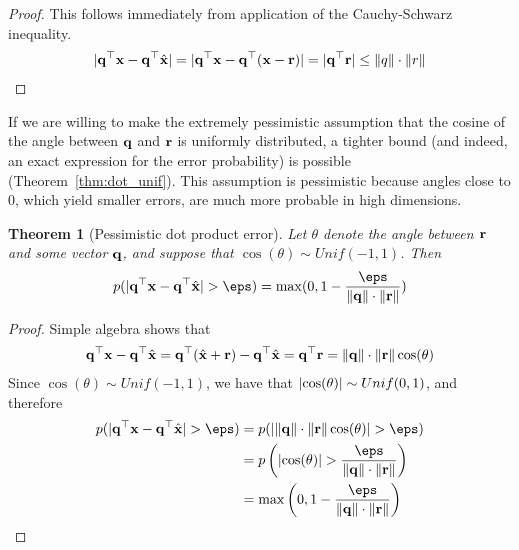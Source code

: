 \documentclass[]{article}
\newtheorem{theorem}{Theorem}[section]
\begin{document}
\begin{proof} \label{thm:dot_unif}
This follows immediately from application of the Cauchy-Schwarz inequality.
\begin{align}
    \lvert\mathbf{q}^\top \mathbf{x} - \mathbf{q}^\top \hat{\mathbf{x}}\rvert = \lvert\mathbf{q}^\top \mathbf{x} - \mathbf{q}^\top (\mathbf{x} - \mathbf{r})\rvert = \lvert\mathbf{q}^\top \mathbf{r}\rvert \le \lVert q\rVert \cdot \lVert r\rVert
\end{align}
\end{proof}


If we are willing to make the extremely pessimistic assumption that the cosine of the angle between $\mathbf{q}$ and $\mathbf{r}$ is uniformly distributed, a tighter bound (and indeed, an exact expression for the error probability) is possible (Theorem~\ref{thm:dot_unif}). This assumption is pessimistic because angles close to $0$, which yield smaller errors, are much more probable in high dimensions. %

\begin{theorem}[Pessimistic dot product error]
Let $\theta$ denote the angle between $\mathbf{r}$ and some vector $\mathbf{q}$, and suppose that $\cos(\theta) \sim Unif(-1, 1)$. Then
\begin{align}
    p(\abs{\q^\top \x - \q^\top \xhat} > \eps) = \max(0, 1 - \frac{\eps}{\norm{\q} \cdot \norm{\r}})
\end{align}
\end{theorem}

\begin{proof}
Simple algebra shows that
\begin{align} \label{eq:qTr}
    \mathbf{q}^\top \mathbf{x} - \mathbf{q}^\top \hat{\mathbf{x}} = \mathbf{q}^\top(\hat{\mathbf{x}} + \mathbf{r}) - \mathbf{q}^\top \hat{\mathbf{x}} = \mathbf{q}^\top \mathbf{r} = \lVert\mathbf{q}\rVert \cdot \lVert\mathbf{r}\rVert \cos(\theta)
\end{align}
Since $\cos(\theta) \sim Unif(-1, 1)$, we have that $\lvert\cos(\theta)\rvert \sim Unif(0, 1)$, and therefore
\begin{align}
    p(\abs{\q^\top \x - \q^\top \xhat} > \eps) &= p(\abs{\norm{\q} \cdot \norm{\r} \cos(\theta)} > \eps ) \\
    &= p \left( \abs{\cos(\theta)} > \frac{\eps}{\norm{\q} \cdot \norm{\r} } \right) \\
    &= \max \left( 0, 1 - \frac{\eps}{\norm{\q} \cdot \norm{\r}} \right)
\end{align}
\end{proof}
\end{document}
